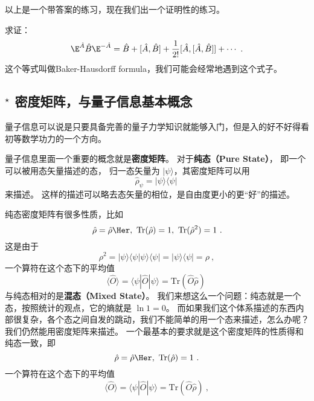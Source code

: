 以上是一个带答案的练习，现在我们出一个证明性的练习。

\begin{exercise}{}
求证：
\begin{equation}
\E^{\hat A}\hat B \E^{-\hat A} = \hat{B} + [\hat A,\hat B] + \frac{1}{2!} [\hat A, [\hat A,\hat B]] + \cdots~.
\end{equation}
这个等式叫做Baker-Hausdorff formula，我们可能会经常地遇到这个式子。
\end{exercise}

\subsection{$^\star$ 密度矩阵，与量子信息基本概念}

量子信息可以说是只要具备完善的量子力学知识就能够入门，但是入的好不好得看初等数学功力的一个方向。

量子信息里面一个重要的概念就是\textbf{密度矩阵}。 对于\textbf{纯态（Pure State）}， 即一个可以被用态矢量描述的态， 归一态矢量为 $|\psi\rangle$，其密度矩阵可以用
\begin{equation}
\hat\rho_{\psi} = |\psi\rangle\langle\psi|~
\end{equation}
来描述。 这样的描述可以略去态矢量的相位，是自由度更小的更“好”的描述。

纯态密度矩阵有很多性质，比如
\begin{equation}
\hat\rho = \hat\rho\Her,\ \text{Tr}(\hat\rho) = 1,\ \text{Tr}(\hat\rho^2) = 1~.
\end{equation}
这是由于
\begin{equation}
\rho^2 = |\psi\rangle\langle\psi|\psi\rangle\langle\psi| = |\psi\rangle\langle\psi| = \rho~,
\end{equation}
一个算符在这个态下的平均值
\begin{equation}
\langle\hat O\rangle = \langle\psi|\hat O|\psi\rangle = \text{Tr}(\hat O\hat \rho)~
\end{equation}
与纯态相对的是\textbf{混态（Mixed State）}。 我们来想这么一个问题：纯态就是一个态，按照统计的观点，它的熵就是 $\ln 1 = 0$。 而如果我们这个体系描述的东西内部很复杂，各个态之间自发的跳动，我们不能简单的用一个态来描述，怎么办呢？我们仍然能用密度矩阵来描述。 一个最基本的要求就是这个密度矩阵的性质得和纯态一致，即
\begin{equation}
\hat\rho = \hat\rho\Her,\ \text{Tr}(\hat\rho) = 1~.
\end{equation}
一个算符在这个态下的平均值
\begin{equation}
\langle\hat O\rangle = \langle\psi|\hat O|\psi\rangle = \text{Tr}(\hat O\hat \rho)~,
\end{equation}

